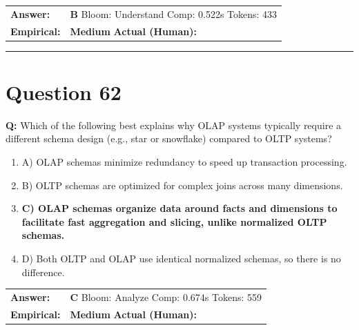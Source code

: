 \documentclass[9pt]{article}
\begin{document}
\begin{tabular}{@{}l p{10.5cm}@{}}
\textbf{Answer:} & \textbf{B} \hspace{1em} Bloom: Understand \hspace{1em} Comp: 0.522s \hspace{1em} Tokens: 433 \\
\textbf{Empirical:} & \textbf{Medium} \hspace{1em} \textbf{Actual (Human):} \underline{\hspace{5cm}}
\end{tabular}

\vspace{0.2cm}
\rule{\textwidth}{0.4pt}
\vspace{0.2cm}


\section*{Question 62}

\textbf{Q:} Which of the following best explains why OLAP systems typically require a different schema design (e.g., star or snowflake) compared to OLTP systems?

\begin{enumerate}[label=\textbf{\alph{*})}, nosep]
    \item A) OLAP schemas minimize redundancy to speed up transaction processing.
    \item B) OLTP schemas are optimized for complex joins across many dimensions.
    \item \textbf{C) OLAP schemas organize data around facts and dimensions to facilitate fast aggregation and slicing, unlike normalized OLTP schemas.} %
    \item D) Both OLTP and OLAP use identical normalized schemas, so there is no difference.

\end{enumerate}

\begin{tabular}{@{}l p{10.5cm}@{}}
\textbf{Answer:} & \textbf{C} \hspace{1em} Bloom: Analyze \hspace{1em} Comp: 0.674s \hspace{1em} Tokens: 559 \\
\textbf{Empirical:} & \textbf{Medium} \hspace{1em} \textbf{Actual (Human):} \underline{\hspace{5cm}}
\end{tabular}
\end{document}
